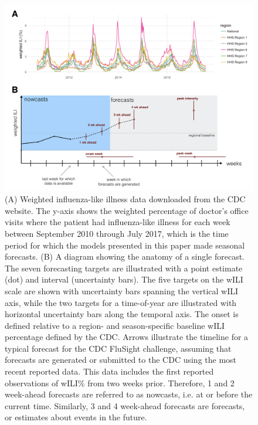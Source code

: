 \documentclass{article}
\begin{document}
\begin{figure}[htbp]
\begin{center}
\includegraphics[width=\textwidth]{static-figures/timezero-sketch.pdf}
\caption{(A) Weighted influenza-like illness data downloaded from the CDC website. The y-axis shows the weighted percentage of doctor's office visits where the patient had influenza-like illness for each week between September 2010 through July 2017, which is the time period for which the models presented in this paper made seasonal forecasts. (B) A diagram showing the anatomy of a single forecast. The seven forecasting targets are illustrated with a point estimate (dot) and interval (uncertainty bars). The five targets on the wILI scale are shown with uncertainty bars spanning the vertical wILI axis, while the two targets for a time-of-year are illustrated with horizontal uncertainty bars along the temporal axis. The onset is defined relative to a region- and season-specific baseline wILI percentage defined by the CDC. Arrows illustrate the timeline for a typical forecast for the CDC FluSight challenge, assuming that forecasts are generated or submitted to the CDC using the most recent reported data. This data includes the first reported observations of wILI\% from two weeks prior. Therefore, 1 and 2 week-ahead forecasts are referred to as nowcasts, i.e. at or before the current time. Similarly, 3 and 4 week-ahead forecasts are forecasts, or estimates about events in the future.}
\label{fig:intro-schematic}
\end{center}
\end{figure}
\end{document}
